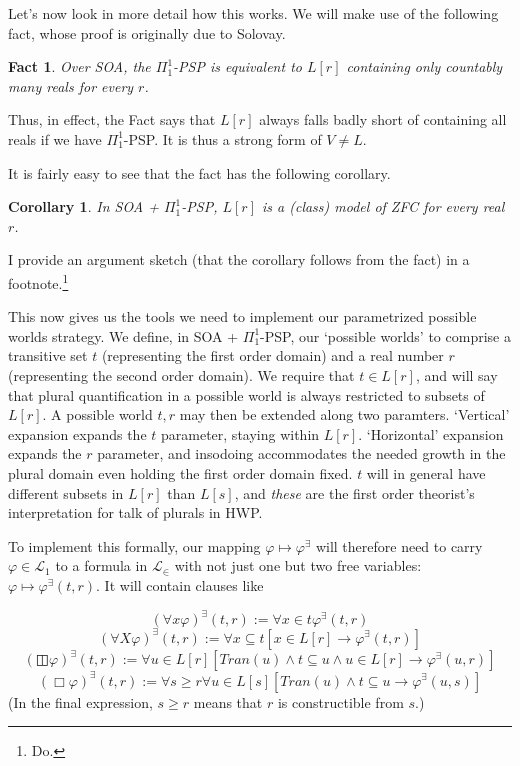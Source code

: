 \documentclass{article}
\newtheorem{fact}[theorem]{Fact}
\newtheorem{corollary}[theorem]{Corollary}
\begin{document}
Let's now look in more detail 
how this works. We will make use of the following fact, whose proof 
is originally due to Solovay.
\begin{fact}
    Over SOA, the $\Pi_1^1$-PSP is equivalent to $L[r]$ containing only 
    countably many reals for every $r$.
\end{fact}
Thus, in effect, the Fact says that $L[r]$ always falls badly short of containing 
all reals if we have $\Pi_1^1$-PSP. It is thus a strong form of $V \not = L$.

It is fairly easy to see that the fact has the following corollary.
\begin{corollary}
    In  SOA + $\Pi_1^1$-PSP, $L[r]$ is a (class) model of ZFC for every real $r$.
\end{corollary}
I provide an argument sketch (that the corollary follows from the fact) in 
a footnote.\footnote{
    Do.
}

This now gives us the tools we need to implement our parametrized possible worlds 
strategy. We define, in SOA + $\Pi_1^1$-PSP, our `possible worlds' to comprise
a transitive set $t$ (representing the first order domain) and a real number $r$
(representing the second order domain). We require that $t \in L[r]$, 
and will say that plural quantification in a possible world is always 
restricted to subsets of $L[r]$. A possible world $t, r$ may then be extended 
along two paramters. `Vertical' expansion expands the $t$ parameter, staying within 
$L[r]$. `Horizontal' expansion expands the $r$ parameter, and insodoing 
accommodates the needed growth in the plural domain even holding the first 
order domain fixed. $t$ will in general have different subsets in $L[r]$ than 
$L[s]$, and \emph{these} are the first order theorist's interpretation for talk of 
plurals in HWP. 

To implement this formally, 
our mapping $\varphi \mapsto \varphi^\exists$ will therefore 
need to carry $\varphi \in \mathcal{L}_1$ to a formula in $\mathcal{L}_\in$ with 
not just one but two free variables: $\varphi \mapsto \varphi^\exists(t, r)$. It will 
contain clauses like 

\[ (\forall x \varphi)^\exists(t, r) := \forall x \in t \varphi^\exists(t, r) \]
\[ (\forall X \varphi)^\exists(t, r) := \forall x \subseteq t [x \in L[r] \rightarrow \varphi^\exists(t, r)] \]
\[ (\boxbar \varphi)^\exists(t, r) := \forall u \in L[r] [Tran(u) \wedge t \subseteq u \wedge u \in L[r] \rightarrow \varphi^\exists(u, r)]\]
\[ (\Box \varphi)^\exists(t, r) := \forall s \geq r \forall u \in L[s] [Tran(u) \wedge t \subseteq u  \rightarrow \varphi^\exists(u, s)]\]
(In the final expression, $s \geq r$ means that $r$ is constructible from $s$.)
\end{document}
